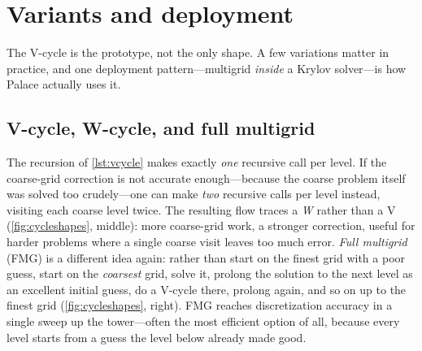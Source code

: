 \section{Variants and deployment}
\label{sec:variants}

The V-cycle is the prototype, not the only shape. A few variations matter in practice, and
one deployment pattern---multigrid \emph{inside} a Krylov solver---is how Palace actually
uses it.

\subsection{V-cycle, W-cycle, and full multigrid}

The recursion of \cref{lst:vcycle} makes exactly \emph{one} recursive call per level. If the
coarse-grid correction is not accurate enough---because the coarse problem itself was solved
too crudely---one can make \emph{two} recursive calls per level instead, visiting each coarse
level twice. The resulting flow traces a \emph{W} rather than a V (\cref{fig:cycleshapes},
middle): more coarse-grid work, a stronger correction, useful for harder problems where a
single coarse visit leaves too much error. \emph{Full multigrid} (FMG) is a different idea
again: rather than start on the finest grid with a poor guess, start on the \emph{coarsest}
grid, solve it, prolong the solution to the next level as an excellent initial guess, do a
V-cycle there, prolong again, and so on up to the finest grid (\cref{fig:cycleshapes},
right). FMG reaches discretization accuracy in a single sweep up the tower---often the most
efficient option of all, because every level starts from a guess the level below already
made good.

